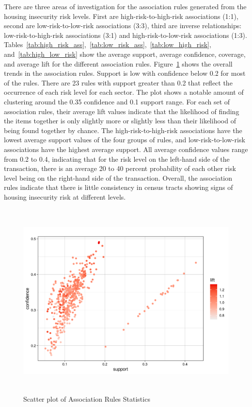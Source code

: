 There are three areas of investigation for the association rules generated from the housing insecurity risk levels. First are high-risk-to-high-risk associations (1:1), second are low-risk-to-low-risk associations (3:3), third are inverse relationships: low-risk-to-high-risk associations (3:1) and high-risk-to-low-risk associations (1:3). Tables~\ref{tab:high_risk_ass},~\ref{tab:low_risk_ass},~\ref{tab:low_high_risk}, and~\ref{tab:high_low_risk} show the average support, average confidence, coverage, and average lift for the different association rules. Figure~\ref{fig:assoc_scatter} shows the overall trends in the association rules. Support is low with confidence below 0.2 for most of the rules.  There are 23 rules with support greater than 0.2 that reflect the occurrence of each risk level for each sector. The plot shows a notable amount of clustering around the 0.35 confidence and 0.1 support range. For each set of association rules, their average lift values indicate that the likelihood of finding the items together is only slightly more or slightly less than their likelihood of being found together by chance. The high-risk-to-high-risk associations have the lowest average support values of the four groups of rules, and low-risk-to-low-risk associations have the highest average support. All average confidence values range from 0.2 to 0.4, indicating that for the risk level on the left-hand side of the transaction, there is an average 20 to 40 percent probability of each other risk level being on the right-hand side of the transaction. Overall, the association rules indicate that there is little consistency in census tracts showing signs of housing insecurity risk at different levels. 


 \begin{figure}[htbp]
    \centering
     \includegraphics[width=1\textwidth, height=10cm]{plots/assoc_scatter.png}
     \caption{Scatter plot of Association Rules Statistics}
     \label{fig:assoc_scatter} %
 \end{figure}

